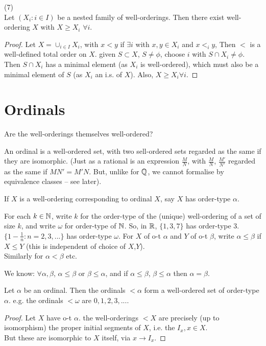 \documentclass[a4paper]{article}
\begin{document}
\begin{prop} (7)\\
Let $(X_i:i \in I)$ be a nested family of well-orderings. Then there exist well-ordering $X$ with $X \geq X_i$ $\forall i$.
\begin{proof}
Let $X = \cup_{i \in I} X_i$, with $x<y$ if $\exists i$ with $x,y \in X_i$ and $x <_i y$, Then $<$ is a well-defined total order on $X$. given $S \subset X$, $S \neq \phi$, choose $i$ with $S\cap X_i \neq \phi$. Then $S \cap X_i$ has a minimal element (as $X_i$ is well-ordered), which must also be a minimal element of $S$ (as $X_i$ an i.s. of $X$). Also, $X \geq X_i \forall i$.
\end{proof}
\end{prop}

\newpage

\section{Ordinals}

Are the well-orderings themselves well-ordered?

An ordinal is a well-ordered set, with two sell-ordered sets regarded as the same if they are isomorphic. (Just as a rational is an expression $\frac{M}{N}$, with $\frac{M}{N}$, $\frac{M'}{N'}$ regarded as the same if $MN' = M'N$. But, unlike for $\mathbb{Q}$, we cannot formalise by equivalence classes -- see later).

If $X$ is a well-ordering corresponding to ordinal $X$, say $X$ has order-type $\alpha$.

\begin{eg}
For each $k \in \mathbb{N}$, write $k$ for the order-type of the (unique) well-ordering of a set of size $k$, and write $\omega$ for order-type of $\mathbb{N}$. So, in $\mathbb{R}$, $\{1,3,7\}$ has order-type 3. $\{1-\frac{1}{n}:n=2,3,...\}$ has order-type $\omega$. For $X$ of o-t $\alpha$ and $Y$ of o-t $\beta$, write $\alpha \leq \beta$ if $X \leq Y$ (this is independent of choice of $X$,$Y$).\\
Similarly for $\alpha<\beta$ etc.
\end{eg}

We know: $\forall \alpha,\beta$, $\alpha\leq \beta$ or $\beta\leq\alpha$, and if $\alpha\leq \beta$, $\beta\leq\alpha$ then $\alpha=\beta$.

\begin{thm}
Let $\alpha$ be an ordinal. Then the ordinals $<\alpha$ form a well-ordered set of order-type $\alpha$. e.g. the ordinals $<\omega$ are $0,1,2,3,...$.
\begin{proof}
Let $X$ have o-t $\alpha$. the well-orderings $<X$ are precisely (up to isomorphism) the proper initial segments of $X$, i.e. the $I_{x},x \in X$.\\
But these are isomorphic to $X$ itself, via $x \to I_x$.
\end{proof}
\end{thm}
\end{document}
